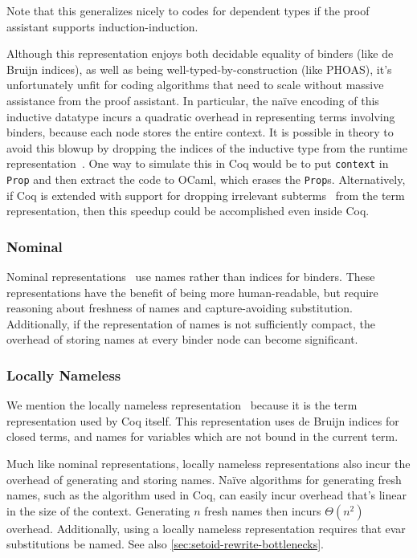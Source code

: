 Note that this generalizes nicely to codes for dependent types if the proof assistant supports induction-induction.

Although this representation enjoys both decidable equality of binders (like de Bruijn indices), as well as being well-typed-by-construction (like PHOAS), it's unfortunately unfit for coding algorithms that need to scale without massive assistance from the proof assistant.
In particular, the naïve encoding of this inductive datatype incurs a quadratic overhead in representing terms involving binders, because each node stores the entire context.
It is possible in theory to avoid this blowup by dropping the indices of the inductive type from the runtime representation~\cite{Inductive2003Brady}.
One way to simulate this in Coq would be to put \texttt{context} in \texttt{Prop} and then extract the code to OCaml, which erases the \texttt{Prop}s.
Alternatively, if Coq is extended with support for dropping irrelevant subterms~\cite{sprop} from the term representation, then this speedup could be accomplished even inside Coq.

\subsubsection{Nominal} \label{sec:binders:nominal}
Nominal representations~\cite{Nominal2003Pitts} use names rather than indices for binders.
These representations have the benefit of being more human-readable, but require reasoning about freshness of names and capture-avoiding substitution.
Additionally, if the representation of names is not sufficiently compact, the overhead of storing names at every binder node can become significant.

\subsubsection{Locally Nameless} \label{sec:binders:locally-nameless}
We mention the locally nameless representation~\cite{Locally2012Chargueraud,locally2007Leroy} because it is the term representation used by Coq itself.
This representation uses de Bruijn indices for closed terms, and names for variables which are not bound in the current term.

Much like nominal representations, locally nameless representations also incur the overhead of generating and storing names.
Naïve algorithms for generating fresh names, such as the algorithm used in Coq, can easily incur overhead that's linear in the size of the context.
Generating $n$ fresh names then incurs $\mathcal \Theta(n^2)$ overhead.
Additionally, using a locally nameless representation requires that evar substitutions be named.
See also \autoref{sec:setoid-rewrite-bottlenecks}.

